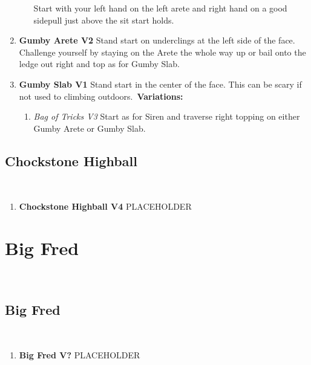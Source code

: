 \begin{enumerate}[resume]
\begin{enumerate}
		\newline Start with your left hand on the left arete and right hand on a good sidepull just above the sit start holds.\
	\end{enumerate}
	\item\label{rt:Gumby Arete} \colorbox{green!20}{\textbf{Gumby Arete V2    } }
	\newline Stand start on underclings at the left side of the face. Challenge yourself by staying on the Arete the whole way up or bail onto the ledge out right and top as for Gumby Slab.\
	\item\label{rt:Gumby Slab} \colorbox{green!20}{\textbf{Gumby Slab V1     } }
	\newline Stand start in the center of the face. This can be scary if not used to climbing outdoors.\
	\newline \textbf{Variations:}
	\begin{enumerate}
		\item\label{vr:Bag of Tricks} \colorbox{green!20}{\emph{Bag of Tricks V3 \ding{72}  }  }
		\newline Start as for Siren and traverse right topping on either Gumby Arete or Gumby Slab.\
	\end{enumerate}
\end{enumerate}
\subsection*{Chockstone Highball}\label{bf:Chockstone Highball}
\

\begin{enumerate}[resume]
	\item\label{rt:Chockstone Highball} \colorbox{RoyalBlue!20}{\textbf{Chockstone Highball V4  } }
	\newline PLACEHOLDER\
\end{enumerate}
\section{Big Fred}\label{sa:Big Fred}
\
\subsection*{Big Fred}\label{bf:Big Fred}
\

\begin{enumerate}[]
	\item\label{rt:Big Fred} \colorbox{black!20}{\textbf{Big Fred V?  } }
	\newline PLACEHOLDER\
\end{enumerate}
